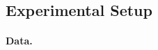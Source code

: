 \documentclass[11pt,a4paper,table]{article}
\begin{document}
\subsection{Experimental Setup}\label{sec:experiments}


\paragraph{Data.}
\end{document}
